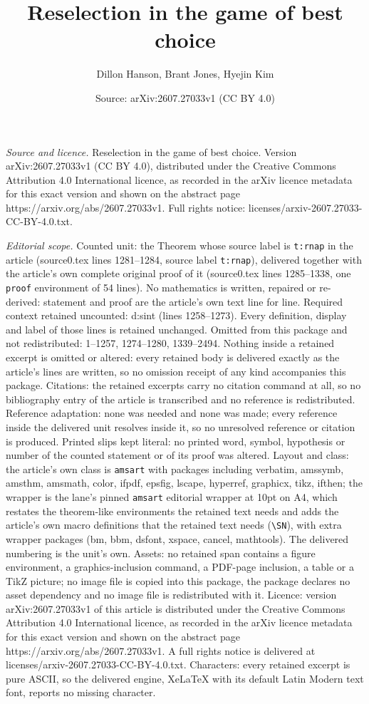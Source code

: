 \documentclass[10pt,a4paper]{amsart}
\title[Reselection in the game of best choice]{Reselection in the game of best choice}
\author{Dillon Hanson, Brant Jones, Hyejin Kim}
\date{Source: arXiv:2607.27033v1 (CC BY 4.0)}
\begin{document}
\maketitle

\noindent\emph{Source and licence.} Reselection in the game of best choice. Version arXiv:2607.27033v1 (CC BY 4.0), distributed under the Creative Commons Attribution 4.0 International licence, as recorded in the arXiv licence metadata for this exact version and shown on the abstract page https://arxiv.org/abs/2607.27033v1. Full rights notice: licenses/arxiv-2607.27033-CC-BY-4.0.txt.\par\smallskip

\noindent\textit{Editorial scope.} Counted unit: the Theorem whose source label is \texttt{t:rnap} in the article (source0.tex lines 1281--1284, source label \texttt{t:rnap}), delivered together with the article's own complete original proof of it (source0.tex lines 1285--1338, one \texttt{proof} environment of 54 lines). No mathematics is written, repaired or re-derived: statement and proof are the article's own text line for line. Required context retained uncounted: d:sint (lines 1258--1273). Every definition, display and label of those lines is retained unchanged. Omitted from this package and not redistributed: 1--1257, 1274--1280, 1339--2494. Nothing inside a retained excerpt is omitted or altered: every retained body is delivered exactly as the article's lines are written, so no omission receipt of any kind accompanies this package. Citations: the retained excerpts carry no citation command at all, so no bibliography entry of the article is transcribed and no reference is redistributed. Reference adaptation: none was needed and none was made; every reference inside the delivered unit resolves inside it, so no unresolved reference or citation is produced. Printed slips kept literal: no printed word, symbol, hypothesis or number of the counted statement or of its proof was altered. Layout and class: the article's own class is \texttt{amsart} with packages including verbatim, amssymb, amsthm, amsmath, color, ifpdf, epsfig, lscape, hyperref, graphicx, tikz, ifthen; the wrapper is the lane's pinned \texttt{amsart} editorial wrapper at 10pt on A4, which restates the theorem-like environments the retained text needs and adds the article's own macro definitions that the retained text needs (\texttt{\textbackslash SN}), with extra wrapper packages (bm, bbm, dsfont, xspace, cancel, mathtools). The delivered numbering is the unit's own. Assets: no retained span contains a figure environment, a graphics-inclusion command, a PDF-page inclusion, a table or a TikZ picture; no image file is copied into this package, the package declares no asset dependency and no image file is redistributed with it. Licence: version arXiv:2607.27033v1 of this article is distributed under the Creative Commons Attribution 4.0 International licence, as recorded in the arXiv licence metadata for this exact version and shown on the abstract page https://arxiv.org/abs/2607.27033v1. A full rights notice is delivered at licenses/arxiv-2607.27033-CC-BY-4.0.txt. Characters: every retained excerpt is pure ASCII, so the delivered engine, XeLaTeX with its default Latin Modern text font, reports no missing character.
\end{document}
